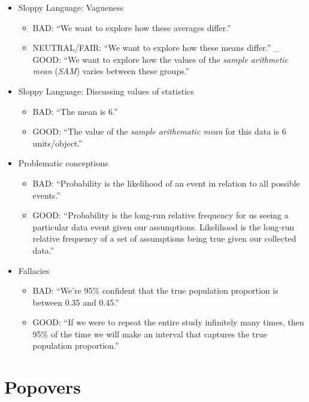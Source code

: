 \documentclass[
]{book}
\providecommand{\tightlist}{%
  \setlength{\itemsep}{0pt}\setlength{\parskip}{0pt}}
\begin{document}
\begin{itemize}
\tightlist
\item
  Sloppy Language: Vagueness

  \begin{itemize}
  \tightlist
  \item
    BAD: ``We want to explore how these averages differ.''
  \item
    NEUTRAL/FAIR: ``We want to explore how these means differ.''
    \_ GOOD: ``We want to explore how the values of the \emph{sample arithmetic mean} (\emph{SAM}) varies between these groups.''
  \end{itemize}
\item
  Sloppy Language: Discussing values of statistics

  \begin{itemize}
  \tightlist
  \item
    BAD: ``The mean is 6.''
  \item
    GOOD: ``The value of the \emph{sample arithematic mean} for this data is 6 units/object.''
  \end{itemize}
\item
  Problematic conceptions

  \begin{itemize}
  \tightlist
  \item
    BAD: ``Probability is the likelihood of an event in relation to all possible events.''
  \item
    GOOD: ``Probability is the long-run relative frequency for us seeing a particular data event given our assumptions. Likelihood is the long-run relative frequency of a set of assumptions being true given our collected data.''
  \end{itemize}
\item
  Fallacies

  \begin{itemize}
  \tightlist
  \item
    BAD: ``We're 95\% confident that the true population proportion is between 0.35 and 0.45.''
  \item
    GOOD: ``If we were to repeat the entire study infinitely many times, then 95\% of the time we will make an interval that captures the true population proportion.''
  \end{itemize}
\end{itemize}

\hypertarget{popovers}{%
\section{Popovers}\label{popovers}}
\end{document}
